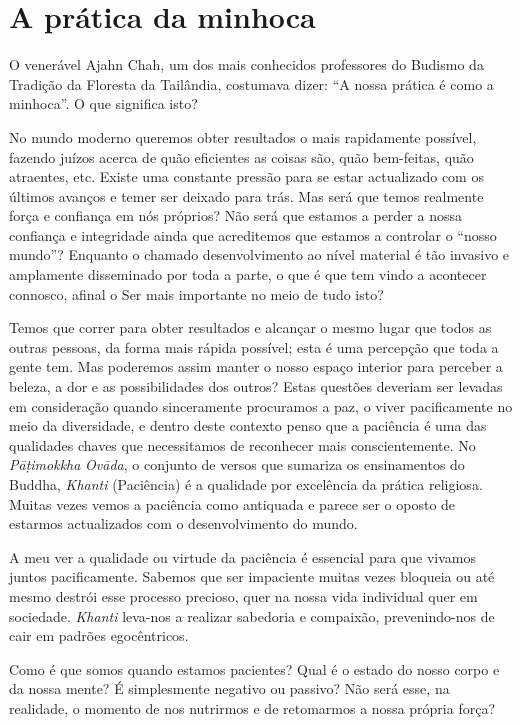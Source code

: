 \chapter{A prática da minhoca}

O venerável Ajahn Chah, um dos mais conhecidos professores do Budismo da
Tradição da Floresta da Tailândia, costumava dizer: ``A nossa prática é
como a minhoca''. O que significa isto?

No mundo moderno queremos obter resultados o mais rapidamente possível,
fazendo juízos acerca de quão eficientes as coisas são, quão bem-feitas,
quão atraentes, etc. Existe uma constante pressão para se estar
actualizado com os últimos avanços e temer ser deixado para trás. Mas
será que temos realmente força e confiança em nós próprios? Não será que
estamos a perder a nossa confiança e integridade ainda que acreditemos
que estamos a controlar o ``nosso mundo''? Enquanto o chamado
desenvolvimento ao nível material é tão invasivo e amplamente
disseminado por toda a parte, o que é que tem vindo a acontecer
connosco, afinal o Ser mais importante no meio de tudo isto?

Temos que correr para obter resultados e alcançar o mesmo lugar que
todos as outras pessoas, da forma mais rápida possível; esta é uma
percepção que toda a gente tem. Mas poderemos assim manter o nosso
espaço interior para perceber a beleza, a dor e as possibilidades dos
outros? Estas questões deveriam ser levadas em consideração quando
sinceramente procuramos a paz, o viver pacificamente no meio da
diversidade, e dentro deste contexto penso que a paciência é uma das
qualidades chaves que necessitamos de reconhecer mais conscientemente.
No \emph{Pāṭimokkha} \emph{Ovāda}, o conjunto de versos que sumariza os
ensinamentos do Buddha, \emph{Khanti} (Paciência) é a qualidade por
excelência da prática religiosa. Muitas vezes vemos a paciência como
antiquada e parece ser o oposto de estarmos actualizados com o
desenvolvimento do mundo.

A meu ver a qualidade ou virtude da paciência é essencial para que
vivamos juntos pacificamente. Sabemos que ser impaciente muitas vezes
bloqueia ou até mesmo destrói esse processo precioso, quer na nossa vida
individual quer em sociedade. \emph{Khanti} leva-nos a realizar
sabedoria e compaixão, prevenindo-nos de cair em padrões egocêntricos.

Como é que somos quando estamos pacientes? Qual é o estado do nosso
corpo e da nossa mente? É simplesmente negativo ou passivo? Não será
esse, na realidade, o momento de nos nutrirmos e de retomarmos a nossa
própria força?

